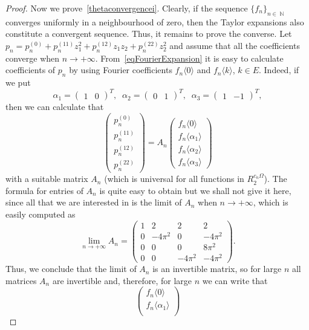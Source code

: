 \documentclass[10pt,a4paper]{amsart}
\DeclareMathOperator{\NN}{\mathbb N}
\begin{document}
\begin{proof}
		Now we prove~\ref{thetaconvergencei}. Clearly, if the sequence $\{f_n\}_{n \in \NN}$ converges uniformly in a neighbourhood of zero, then the Taylor expansions also constitute a convergent sequence. Thus, it remains to prove the converse. Let $p_n = p_n^{(0)} + p_n^{(11)}z_1^2 + p_n^{(12)}z_1z_2 + p_n^{(22)}z_2^2$ and assume that all the coefficients converge when $n \to +\infty$. From~\eqref{eqFourierExpansion} it is easy to calculate coefficients of $p_n$ by using Fourier coefficients $f_n \langle 0\rangle$ and $f_n\langle k\rangle$, $k \in E$. Indeed, if we put
		\[
		\alpha_1 = \begin{pmatrix}
			1 & 0
		\end{pmatrix}^T,\;\;\alpha_2 = \begin{pmatrix}
			0 & 1
		\end{pmatrix}^T,\;\;\alpha_3 = \begin{pmatrix}
			1 & -1
		\end{pmatrix}^T,
		\]
		then we can calculate that
		\[
		\begin{pmatrix}
			p_n^{(0)} \\ p_n^{(11)} \\ p_n^{(12)} \\ p_n^{(22)}
		\end{pmatrix} = A_n\begin{pmatrix}
			f_n\langle 0\rangle \\ f_n\langle \alpha_1 \rangle \\
			f_n\langle \alpha_2 \rangle \\ f_n\langle \alpha_3 \rangle
		\end{pmatrix}
		\]
		with a suitable matrix $A_n$ (which is universal for all functions in $R_2^{c_n\Omega}$). The formula for entries of $A_n$ is quite easy to obtain but we shall not give it here, since all that we are interested in is the limit of $A_n$ when $n \to +\infty$, which is easily computed as
		\[
		\lim_{n \to +\infty} A_n = \begin{pmatrix}
			1 & 2 & 2 & 2 \\
			0 & -4\pi^2 & 0 & -4\pi^2\\
			0 & 0 & 0 & 8\pi^2\\
			0 & 0 & -4\pi^2 & -4\pi^2
		\end{pmatrix}.
		\]
		Thus, we conclude that the limit of $A_n$ is an invertible matrix, so for large $n$ all matrices $A_n$ are invertible and, therefore, for large $n$ we can write that \[
		\begin{pmatrix}
			f_n\langle 0\rangle \\ f_n\langle \alpha_1 \rangle \\

\end{pmatrix}\]
\end{proof}
\end{document}

